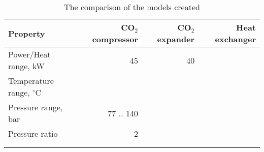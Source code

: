 \begin{table}
\label{tab:DiscussionComparison}
\caption{The comparison of the models created}
\begin{center}
\begin{tabulary}{0.9\textwidth}{LRRR}
\toprule
Property    	                &	CO$_2$ compressor   & CO$_2$	expander    & Heat exchanger    \\
\midrule
Power/Heat range, kW            &       45              &       40              &                   \\
Temperature range, $^\circ$C    &                       &                       &                   \\
Pressure range, bar             &   77 .. 140           &                       &                   \\
Pressure ratio                  &   2                   &                       &                   \\
& & & \\
& & & \\
\bottomrule
\end{tabulary}
\end{center}
\end{table}